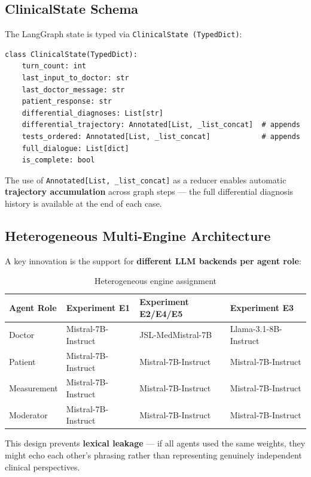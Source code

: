 \documentclass[12pt, a4paper]{article}
\begin{document}
\subsection{ClinicalState Schema}

The LangGraph state is typed via \texttt{ClinicalState (TypedDict)}:

\begin{lstlisting}[style=pystyle]
class ClinicalState(TypedDict):
    turn_count: int
    last_input_to_doctor: str
    last_doctor_message: str
    patient_response: str
    differential_diagnoses: List[str]
    differential_trajectory: Annotated[List, _list_concat]  # appends
    tests_ordered: Annotated[List, _list_concat]            # appends
    full_dialogue: List[dict]
    is_complete: bool
\end{lstlisting}

\noindent The use of \texttt{Annotated[List, \_list\_concat]} as a reducer enables automatic \textbf{trajectory accumulation} across graph steps — the full differential diagnosis history is available at the end of each case.

\subsection{Heterogeneous Multi-Engine Architecture}

A key innovation is the support for \textbf{different LLM backends per agent role}:

\begin{table}[H]
\centering
\caption{Heterogeneous engine assignment}
\begin{tabular}{@{}llll@{}}
\toprule
\textbf{Agent Role} & \textbf{Experiment E1} & \textbf{Experiment E2/E4/E5} & \textbf{Experiment E3} \\
\midrule
Doctor     & Mistral-7B-Instruct & JSL-MedMistral-7B & Llama-3.1-8B-Instruct \\
Patient    & Mistral-7B-Instruct & Mistral-7B-Instruct & Mistral-7B-Instruct \\
Measurement& Mistral-7B-Instruct & Mistral-7B-Instruct & Mistral-7B-Instruct \\
Moderator  & Mistral-7B-Instruct & Mistral-7B-Instruct & Mistral-7B-Instruct \\
\bottomrule
\end{tabular}
\end{table}

\noindent This design prevents \textbf{lexical leakage} — if all agents used the same weights, they might echo each other's phrasing rather than representing genuinely independent clinical perspectives.
\end{document}

